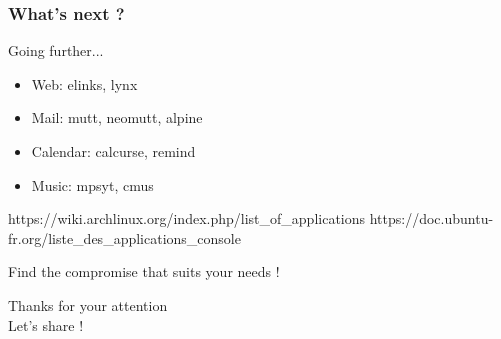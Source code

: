 \documentclass[aspectratio=169]{beamer}
\begin{document}
\begin{frame}
    \frametitle{What's next ?}
    Going further...\newline
    \begin{itemize}
    \item Web: elinks, lynx
    \item Mail: mutt, neomutt, alpine
    \item Calendar: calcurse, remind
    \item Music: mpsyt, cmus\newline
    \end{itemize}

    https://wiki.archlinux.org/index.php/list\_of\_applications
    https://doc.ubuntu-fr.org/liste\_des\_applications\_console\newline

    Find the compromise that suits your needs !
\end{frame}

\begin{frame}[c]
    \begin{center}
        \Huge Thanks for your attention \\ \huge Let's share !
    \end{center}
\end{frame}
\end{document}
